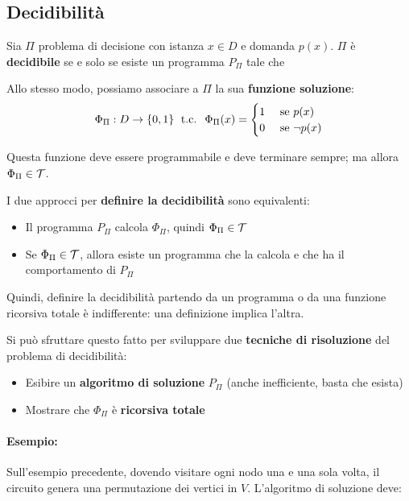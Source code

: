 \vspace{-0.5em}

\subsection{Decidibilità}

Sia $\Pi$ problema di decisione con istanza $x \in D$ e domanda $p(x)$. $\Pi$ è \textbf{decidibile} se e solo se esiste un programma $P_\Pi$ tale che
\begin{center}
	
\end{center}

Allo stesso modo, possiamo associare a $\Pi$ la sua \textbf{funzione soluzione}:
$$ \Phi_\Pi : D \rightarrow \{0,1\} \; \text{ t.c. } \; \Phi_\Pi (x) = \begin{cases}
	1 & \text{ se } p(x) \\
	0 & \text{ se } \neg p(x)
\end{cases}$$

Questa funzione deve essere programmabile e deve terminare sempre; ma allora $\Phi_\Pi \in \mathcal{T}$.

I due approcci per \textbf{definire la decidibilità} sono equivalenti:
\begin{itemize}
	\item Il programma $P_\Pi$ calcola $\Phi_\Pi$, quindi $\Phi_\Pi \in \mathcal{T}$
    
	\item Se $\Phi_\Pi \in \mathcal{T}$, allora esiste un programma che la calcola e che ha il comportamento di $P_\Pi$
\end{itemize}

Quindi, definire la decidibilità partendo da un programma o da una funzione ricorsiva totale è indifferente: una definizione implica l'altra.

Si può sfruttare questo fatto per sviluppare due \textbf{tecniche di risoluzione} del problema di decidibilità:
\begin{itemize}
	\item Esibire un \textbf{algoritmo di soluzione} $P_\Pi$ (anche inefficiente, basta che esista)
    
	\item Mostrare che $\Phi_\Pi$ è \textbf{ricorsiva totale}
\end{itemize}

\paragraph{Esempio:} Sull'esempio precedente, dovendo visitare ogni nodo una e una sola volta, il circuito genera una permutazione dei vertici in $V$. L'algoritmo di soluzione deve:
 

